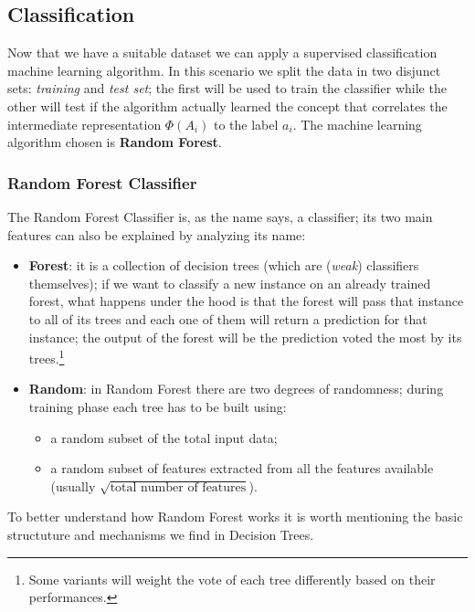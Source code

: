 \subsection{Classification}
Now that we have a suitable dataset we can apply a supervised classification machine learning algorithm. In this scenario we split the data in two disjunct sets: \textit{training} and \textit{test set}; the first will be used to train the classifier while the other will test if the algorithm actually learned the concept that correlates the intermediate representation $\Phi(A_i)$ to the label $a_i$. The machine learning algorithm chosen is \textbf{Random Forest}.

\subsubsection{Random Forest Classifier}
\label{subsubsec:rfc}
The Random Forest Classifier is, as the name says, a classifier; its two main features can also be explained by analyzing its name:
\begin{itemize}
 \item \textbf{Forest}: it is a collection of decision trees (which are (\textit{weak}) classifiers themselves); if we want to classify a new instance on an already trained forest, what happens under the hood is that the forest will pass that instance to all of its trees and each one of them will return a prediction for that instance; the output of the forest will be the prediction voted the most by its trees.\footnote{Some variants will weight the vote of each tree differently based on their performances.}
 \item \textbf{Random}: in Random Forest there are two degrees of randomness; during training phase each tree has to be built using:
 \begin{itemize}
  \item a random subset of the total input data;
  \item a random subset of features extracted from all the features available (usually $\sqrt{\text{total number of features}}$).
 \end{itemize}
\end{itemize}

To better understand how Random Forest works it is worth mentioning the basic structuture and mechanisms we find in Decision Trees. 

